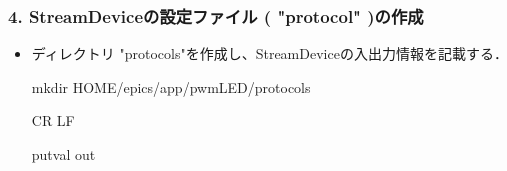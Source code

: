 \documentclass[letterpaper,10pt,dvipdfmx]{sphinxmanual}
\begin{document}
\subsubsection{4. StreamDeviceの設定ファイル ( "protocol" )の作成}
\label{\detokenize{epics/rst/example4__arduino_LEDcontrol02:streamdevice-protocol}}\begin{itemize}
\item {} 
ディレクトリ "protocols"を作成し、StreamDeviceの入出力情報を記載する．

\begin{sphinxVerbatim}[commandchars=\\\{\}]
\PYGZdl{} mkdir \PYGZdl{}HOME/epics/app/pwmLED/protocols
\end{sphinxVerbatim}
\def\sphinxLiteralBlockLabel{\label{\detokenize{epics/rst/example4__arduino_LEDcontrol02:id9}}}
\begin{sphinxVerbatim}[commandchars=\\\{\},numbers=left,firstnumber=1,stepnumber=1]
  CR LF

putval
  out 
\end{sphinxVerbatim}

\end{itemize}
\end{document}
